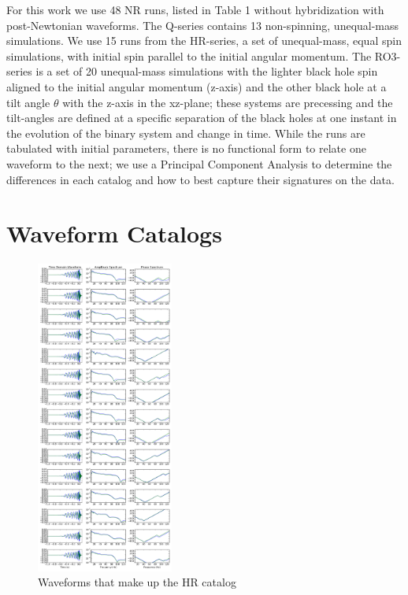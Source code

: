 \documentclass[%
 reprint,
 amsmath,amssymb,
 aps,
]{revtex4-1}
\begin{document}
For this work we use 48 NR runs, listed in Table 1 without hybridization with post-Newtonian waveforms. The Q-series contains 13 non-spinning, unequal-mass simulations. We use 15 runs from the HR-series, a set of unequal-mass, equal spin simulations, with initial spin parallel to the initial angular momentum. The RO3-series is a set of 20 unequal-mass simulations with the lighter black hole spin aligned to the initial angular momentum (z-axis) and the other black hole at a tilt angle $\theta$ with the z-axis in the xz-plane; these systems are precessing and the tilt-angles are defined at a specific separation of the black holes at one instant in the evolution of the binary system and change in time. While the runs are tabulated with initial parameters, there is no functional form to relate one waveform to the next; we use a Principal Component Analysis to determine the differences in each catalog and how to best capture their signatures on the data.

\section{Waveform Catalogs}

\begin{figure}
\centering
\includegraphics[width=0.4\textwidth]{figures/HR-series_catalogue.png}
\caption{Waveforms that make up the HR catalog}
\label{fig:HR_catalog}
\end{figure}
\end{document}
